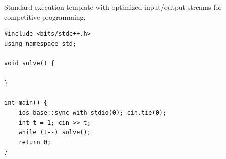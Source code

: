 
Standard execution template with optimized input/output streams for competitive programming.

\begin{lstlisting}
#include <bits/stdc++.h>
using namespace std;

void solve() {
    
}

int main() {
    ios_base::sync_with_stdio(0); cin.tie(0);
    int t = 1; cin >> t;
    while (t--) solve();
    return 0;
}
\end{lstlisting}
